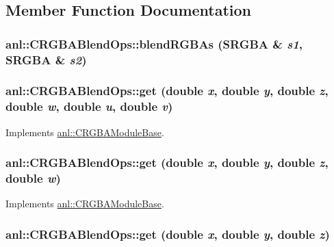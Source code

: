 \subsection{Member Function Documentation}
\hypertarget{classanl_1_1CRGBABlendOps_a7af83e2e3aac64344568cc97d1d405e1}{
\subsubsection[{blendRGBAs}]{ anl::CRGBABlendOps::blendRGBAs ({\bf SRGBA} \& {\em s1}, \/  {\bf SRGBA} \& {\em s2})}}
\label{classanl_1_1CRGBABlendOps_a7af83e2e3aac64344568cc97d1d405e1}
\hypertarget{classanl_1_1CRGBABlendOps_a313f936098a144fcd1bf9acc8bd60ac6}{
\subsubsection[{get}]{ anl::CRGBABlendOps::get (double {\em x}, \/  double {\em y}, \/  double {\em z}, \/  double {\em w}, \/  double {\em u}, \/  double {\em v})}}
\label{classanl_1_1CRGBABlendOps_a313f936098a144fcd1bf9acc8bd60ac6}


Implements \hyperlink{classanl_1_1CRGBAModuleBase_aa5a0b719101302596a697aa8c2292f55}{anl::CRGBAModuleBase}.\hypertarget{classanl_1_1CRGBABlendOps_a892ffe25081bca07ee526fb77bdc0a09}{
\subsubsection[{get}]{ anl::CRGBABlendOps::get (double {\em x}, \/  double {\em y}, \/  double {\em z}, \/  double {\em w})}}
\label{classanl_1_1CRGBABlendOps_a892ffe25081bca07ee526fb77bdc0a09}


Implements \hyperlink{classanl_1_1CRGBAModuleBase_ab94523074ef298bb99f0830051e78c1c}{anl::CRGBAModuleBase}.\hypertarget{classanl_1_1CRGBABlendOps_a4548f067089dfd648ca57471379377ec}{
\subsubsection[{get}]{ anl::CRGBABlendOps::get (double {\em x}, \/  double {\em y}, \/  double {\em z})}}
\label{classanl_1_1CRGBABlendOps_a4548f067089dfd648ca57471379377ec}


